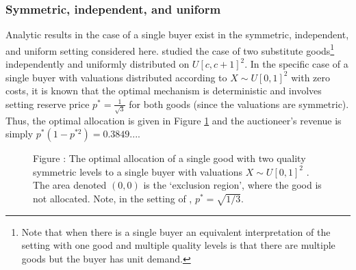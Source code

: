 \subsubsection{Symmetric, independent, and uniform}

Analytic results in the case of a single buyer exist in the symmetric, independent, and uniform setting considered here. \autocite{pavlov2011optimal} studied the case of two substitute goods\footnote{Note that when there is a single buyer an equivalent interpretation of the setting with one good and multiple quality levels is that there are multiple goods but the buyer has unit demand.} independently and uniformly distributed on $U[c,c+1]^2$. In the specific case of a single buyer with valuations distributed according to $X \sim U[0,1]^2$ with zero costs, it is known that the optimal mechanism is deterministic and involves setting reserve price $p^* =\frac{1}{\sqrt{3}}$ for both goods (since the valuations are symmetric). Thus, the optimal allocation is given in Figure \ref{fig:pavlov_alloc} and the auctioneer's revenue is simply $p^*( 1 - p^{*2} ) = 0.3849...$.
 
\begin{figure}[H]
    \begin{center}
    \end{center}
  
    \vspace{1mm}
    \raggedright{\small {\sc Figure \thefig\label{fig:pavlov_alloc}:} The optimal allocation of a single good with two quality symmetric levels to a single buyer with valuations $X \sim U[0,1]^2$ \autocite{pavlov2011optimal}. The area denoted $(0,0)$ is the `exclusion region', where the good is not allocated. Note, in the setting of \autocite{pavlov2011optimal}, $p^*=\sqrt{1/3}$.}
\end{figure}

